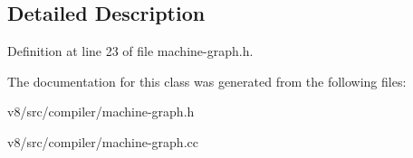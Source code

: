 \subsection{Detailed Description}


Definition at line 23 of file machine-\/graph.\+h.



The documentation for this class was generated from the following files\+:\begin{DoxyCompactItemize}
\item 
v8/src/compiler/machine-\/graph.\+h\item 
v8/src/compiler/machine-\/graph.\+cc\end{DoxyCompactItemize}
